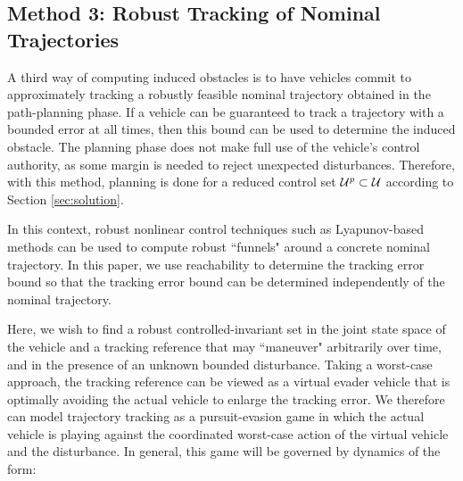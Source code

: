\subsection{Method 3: Robust Tracking of Nominal Trajectories \label{sec:rtt}}
A third way of computing induced obstacles is to have vehicles commit to approximately tracking a robustly feasible nominal trajectory obtained in the path-planning phase. If a vehicle can be guaranteed to track a trajectory with a bounded error at all times, then this bound can be used to determine the induced obstacle. The planning phase does not make full use of the vehicle's control authority, as some margin is needed to reject unexpected disturbances. Therefore, with this method, planning is done for a reduced control set $\mathcal{U}^p\subset\mathcal{U}$ according to Section \ref{sec:solution}.


In this context, robust nonlinear control techniques such as Lyapunov-based methods \cite{Majumdar2013} can be used to compute robust ``funnels" around a concrete nominal trajectory. In this paper, we use reachability to determine the tracking error bound so that the tracking error bound can be determined independently of the nominal trajectory. 

Here, we wish to find a robust controlled-invariant set in the joint state space of the vehicle and a tracking reference that may ``maneuver" arbitrarily over time, and in the presence of an unknown bounded disturbance. Taking a worst-case approach, the tracking reference can be viewed as a virtual evader vehicle that is optimally avoiding the actual vehicle to enlarge the tracking error. We therefore can model trajectory tracking as a pursuit-evasion game in which the actual vehicle is playing against the coordinated worst-case action of the virtual vehicle and the disturbance. In general, this game will be governed by dynamics of the form:

